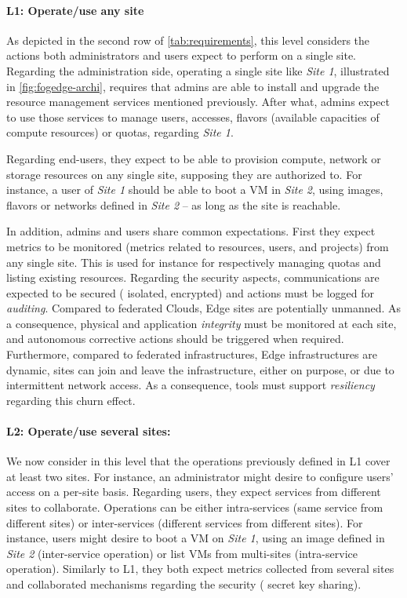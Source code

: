\paragraph{L1: Operate/use any site}
As depicted in the second row of \cref{tab:requirements}, this level considers
the actions both administrators and users expect to perform on a single site.
Regarding the administration side, operating a single site like \emph{Site 1},
illustrated in \cref{fig:fogedge-archi}, requires that admins are able to
install and upgrade the resource management services mentioned previously.
After what, admins expect to use those services to manage users, accesses,
flavors (\ie available capacities of compute resources) or quotas, regarding
\emph{Site 1}.

Regarding end-users, they expect to be able to provision compute, network or
storage resources on any single site, supposing they are authorized to. For
instance, a user of \emph{Site 1} should be able to boot a VM in \emph{Site 2},
using images, flavors or networks defined in \emph{Site 2} -- as long as the
site is reachable.

In addition, admins and users share common expectations.
First they expect metrics to be monitored (\eg metrics related to resources,
users, and projects) from any single site. This is used for instance for
respectively managing quotas and listing existing resources.
Regarding the security aspects, communications are expected to be secured (\eg
isolated, encrypted) and actions must be logged for \emph{auditing}. Compared
to federated Clouds, Edge sites are potentially unmanned. As a consequence,
physical and application \emph{integrity} must be monitored at each site, and
autonomous corrective actions should be triggered when required.
Furthermore, compared to federated infrastructures, Edge infrastructures are
dynamic, \ie sites can join and leave the infrastructure, either on purpose, or
due to intermittent network access. As a consequence, tools must support
\emph{resiliency} regarding this churn effect.

\paragraph{L2: Operate/use several sites:}
We now consider in this level that the operations previously defined in L1
cover at least two sites. For instance, an administrator might desire to
configure users' access on a per-site basis. Regarding users, they expect
services from different sites to collaborate.
Operations can be either intra-services (same service from different sites) or
inter-services (different services from different sites).
%
For instance, users might desire to boot a VM on \emph{Site 1}, using an image
defined in \emph{Site 2} (inter-service operation) or list VMs from multi-sites
(intra-service operation). Similarly to L1, they both expect metrics collected
from several sites and collaborated mechanisms regarding the security (\eg
secret key sharing).

